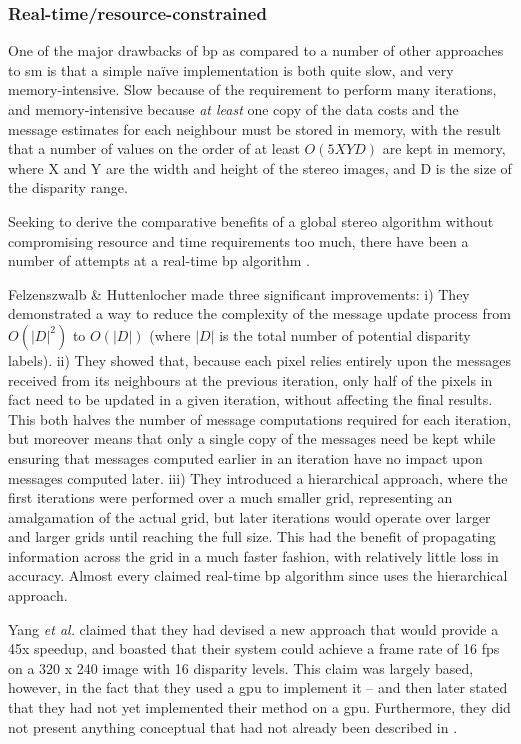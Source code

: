 \subsubsection{Real-time/resource-constrained }
One of the major drawbacks of \gls{bp} as compared to a number of other approaches to \gls{sm} is that a simple naïve implementation is both quite slow, and very memory-intensive.  Slow because of the requirement to perform many iterations, and memory-intensive because \emph{at least} one copy of the data costs and the message estimates for each neighbour must be stored in memory, with the result that a number of values on the order of at least \(O(5XYD)\) are kept in memory, where X and Y are the width and height of the stereo images, and D is the size of the disparity range.

Seeking to derive the comparative benefits of a global stereo algorithm without compromising resource and time requirements too much, there have been a number of attempts at a real-time \gls{bp} algorithm \cite{Xiang2012,Yang2010,Yang2006,Liang2011,Gupta2012,Perez2010,Felzenszwalb2006}.

Felzenszwalb \& Huttenlocher \cite{Felzenszwalb2006} made three significant improvements:  i) They demonstrated a way to reduce the complexity of the message update process from \(O(|D|^2)\) to \(O(|D|)\) (where \(|D|\) is the total number of potential disparity labels).  ii) They showed that, because each pixel relies entirely upon the messages received from its neighbours at the previous iteration, only half of the pixels in fact need to be updated in a given iteration, without affecting the final results.  This both halves the number of message computations required for each iteration, but moreover means that only a single copy of the messages need be kept while ensuring that messages computed earlier in an iteration have no impact upon messages computed later.  iii)  They introduced a hierarchical approach, where the first iterations were performed over a much smaller grid, representing an amalgamation of the actual grid, but later iterations would operate over larger and larger grids until reaching the full size.  This had the benefit of propagating information across the grid in a much faster fashion, with relatively little loss in accuracy.  Almost every claimed real-time \gls{bp} algorithm since uses the hierarchical approach.

Yang \textit{et al.} \cite{Yang2006} claimed that they had devised a new approach that would provide a 45x speedup, and boasted that their system could achieve a frame rate of 16 \gls{fps} on a 320 x 240 image with 16 disparity levels.  This claim was largely based, however, in the fact that they used a \gls{gpu} to implement it -- and then later stated that they had not yet implemented their method on a \gls{gpu}.  Furthermore, they did not present anything conceptual that had not already been described in \cite{Felzenszwalb2006}. %

